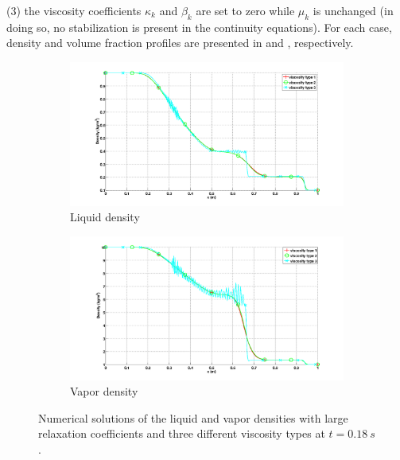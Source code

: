 \documentclass[preprint,10pt]{elsarticle}
\begin{document}
(3) the viscosity coefficients $\kappa_k$ and $\beta_k$ are set to zero while $\mu_k$ is unchanged (in doing so, no stabilization is present in the continuity equations). For each case, density and volume fraction profiles are presented in  and , respectively.
%
\begin{figure}[H]
        \centering
        \begin{subfigure}[b]{0.5\textwidth}
                \centering
                \includegraphics[width=\textwidth]{figures/relaxation_vapor_density_multiple_visc.png}
                \caption{Liquid density}
                \label{fig:liq-density}
        \end{subfigure}%
        \begin{subfigure}[b]{0.5\textwidth}
                \centering
                \includegraphics[width=\textwidth]{figures/relaxation_liquid_density_multiple_visc.png}
                \caption{Vapor density}
                \label{fig:vap-density}
        \end{subfigure}
        \caption{Numerical solutions of the liquid and vapor densities with large relaxation coefficients and three different viscosity types at $t=0.18 \ s$.}\label{fig:density}
\end{figure}
\end{document}
